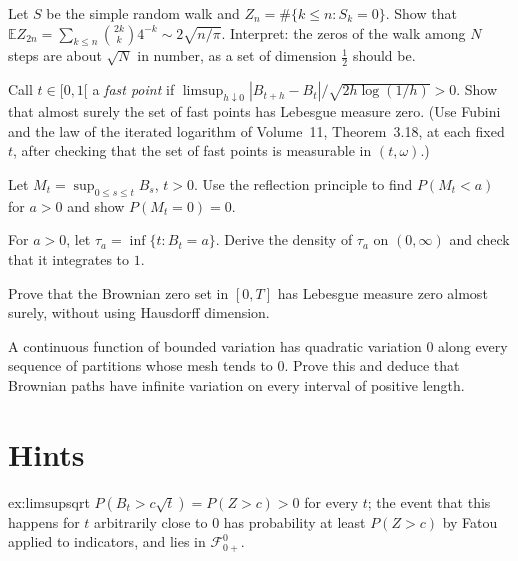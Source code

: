 \begin{exercise}[$\star\star$]\label{ex:walkzeros}
Let $S$ be the simple random walk and $Z_n=\#\{k\le n:S_k=0\}$. Show that $\mathbb E Z_{2n}=\sum_{k\le n}\binom{2k}k4^{-k}\sim2\sqrt{n/\pi}$. Interpret: the zeros of the walk among $N$ steps are about $\sqrt N$ in number,
as a set of dimension $\frac12$ should be.
\end{exercise}

\begin{exercise}[$\star\star\star$]\label{ex:fast}
Call $t\in[0,1[$ a \emph{fast point} if $\limsup_{h\downarrow0}|B_{t+h}-B_t|/\sqrt{2h\log(1/h)}>0$. Show that almost surely the set of fast points has Lebesgue measure zero. (Use Fubini and the law of the iterated
logarithm of Volume~11, Theorem~3.18, at each fixed $t$, after checking that the set of fast points is measurable in $(t,\omega)$.)
\end{exercise}

\begin{exercise}[$\star$]\label{ex:v12maxcdf}
Let $M_t=\sup_{0\le s\le t}B_s$, $t>0$. Use the reflection principle to find $P(M_t<a)$ for $a>0$ and show $P(M_t=0)=0$.
\end{exercise}

\begin{exercise}[$\star\star$]\label{ex:v12hittingdensity}
For $a>0$, let $\tau_a=\inf\{t:B_t=a\}$. Derive the density of $\tau_a$ on $(0,\infty)$ and check that it integrates to $1$.
\end{exercise}

\begin{exercise}[$\star\star$]\label{ex:v12zerooccupation}
Prove that the Brownian zero set in $[0,T]$ has Lebesgue measure zero almost surely, without using Hausdorff dimension.
\end{exercise}

\begin{exercise}[$\star\star\star$]\label{ex:v12noBV}
A continuous function of bounded variation has quadratic variation $0$ along every sequence of partitions whose mesh tends to $0$. Prove this and deduce that Brownian paths have infinite variation on every interval of positive length.
\end{exercise}

\section{Hints}

\begin{hint}{ex:limsupsqrt}
$P(B_t>c\sqrt t)=P(Z>c)>0$ for every $t$; the event that this happens for $t$ arbitrarily close to $0$ has probability at least $P(Z>c)$ by Fatou applied to indicators, and lies in $\mathcal F^0_{0+}$.
\end{hint}

